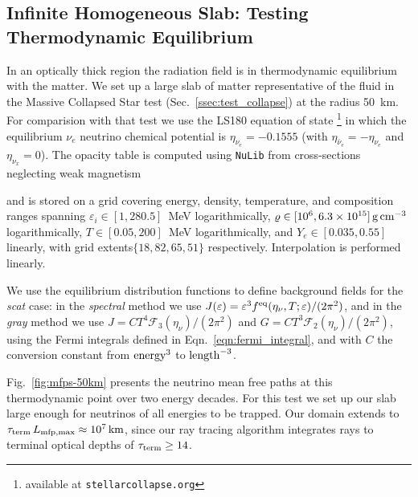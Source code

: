 \documentclass[aps,floatfix,prd,superscriptaddress,twocolumn]{revtex4-1}
\newcommand{\todo}[1]{\marginpar{\tiny{\textcolor{red}{#1}}}}
\renewcommand\todo[1]{} %
\begin{document}
\subsection{Infinite Homogeneous Slab:
  Testing Thermodynamic Equilibrium}
\label{ssec:test_equilibrium}
In an optically thick region the radiation field is in thermodynamic equilibrium
with the matter.
We set up a large slab of matter
representative of the fluid in the Massive Collapsed Star test
(Sec.~\ref{ssec:test_collapse}) at the radius 50~km.
For comparision with that test we use the LS180 equation of state
\cite{latt1991-nuc_eos}
\footnote{available at \lstinline{stellarcollapse.org}}
in which the equilibrium $\nu_e$ neutrino chemical potential is
$\eta_{\nu_e}=-0.1555$
(with $\eta_{\bar{\nu}_e}=-\eta_{\nu_e}$ and $\eta_{\nu_x}=0$).
The opacity table is computed using \lstinline{NuLib} from cross-sections
neglecting weak magnetism
\todo{anything else?}
and is stored on a grid covering energy, density, temperature, and composition
ranges spanning $\varepsilon_i\in[1,280.5]$~MeV logarithmically,
$\varrho\in[10^6,6.3\times10^{15}]\,{\rm g}\,{\rm cm}^{-3}$ logarithmically,
$T\in[0.05,200]$~MeV logarithmically, and 
$Y_e\in[0.035,0.55]$ linearly,
with grid extents$\{18,82,65,51\}$ respectively.
Interpolation is performed linearly.

We use the equilibrium distribution functions to define background
fields for the \emph{scat} case:
in the \emph{spectral} method we use
$J(\varepsilon)=\varepsilon^3 f^{\rm eq}(\eta_\nu,T;\varepsilon)/(2\pi^2)$,
and in the \emph{gray} method we use
$J=C T^4 \mathscr{F}_3(\eta_\nu)/(2\pi^2)$ and
$G=C T^3 \mathscr{F}_2(\eta_\nu)/(2\pi^2)$,
using the Fermi integrals defined in Eqn.~\ref{eqn:fermi_integral},
and with $C$ the conversion constant from ${\rm energy}^3$ to ${\rm length}^{-3}$.

Fig.~\ref{fig:mfps-50km} presents the neutrino mean free paths
at this thermodynamic point over two energy decades.
For this test we set up our slab large enough for neutrinos of all
energies to be trapped.
Our domain extends to $\tau_{\rm term}\,L_{\rm mfp,max}\approx10^7\,{\rm km}$,
since our ray tracing algorithm integrates rays to terminal optical
depths of $\tau_{\rm term}\geq14$.
\end{document}
